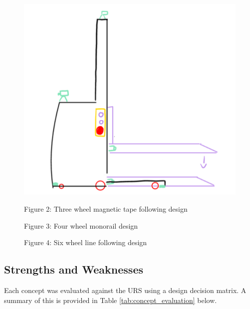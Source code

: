 \documentclass[12pt]{article}
\begin{document}
\begin{figure}[h!]
\begin{minipage}{0.32\textwidth}
    \end{minipage}%
    \hspace{0.01\textwidth}
    \begin{minipage}{0.32\textwidth}
        \centering
        \includegraphics[width=\textwidth]{Louis' design without text.png}
    \end{minipage}
    \hspace{0.01\textwidth}
    
    \vspace{0.5mm}  %
    \begin{minipage}{0.32\textwidth}
        \centering
        \textbf{}Figure 2: Three wheel magnetic tape following design
    \end{minipage}%
    \begin{minipage}{0.32\textwidth}
        \centering
        \textbf{}Figure 3: Four wheel monorail design
    \end{minipage}%
    \begin{minipage}{0.32\textwidth}
        \centering
        \textbf{}Figure 4: Six wheel line following design %
    \end{minipage}
\end{figure}
 

\subsection{Strengths and Weaknesses}
Each concept was evaluated against the URS using a design decision matrix. A summary of this is provided in Table \ref{tab:concept_evaluation} below.
\end{document}
